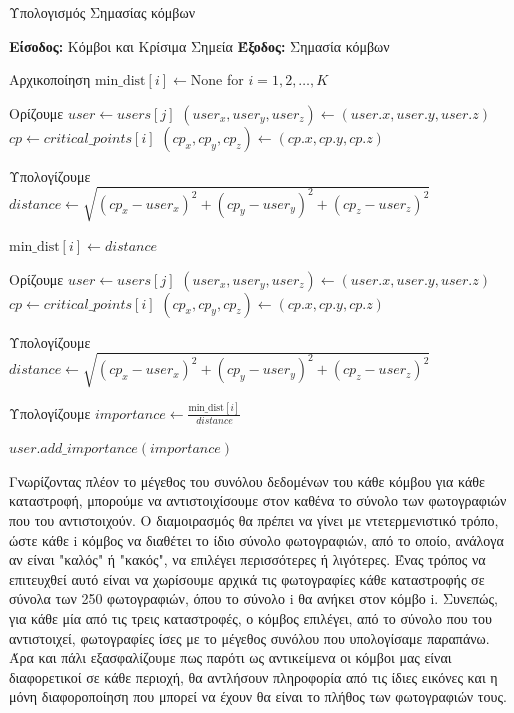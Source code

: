 \vspace{-3pt}
\begin{algorithm}[H]
    \caption{Υπολογισμός Σημασίας κόμβων} \label{algorithm3}
    \begin{algorithmic}[1]
    \STATE \textbf{Είσοδος:} Κόμβοι και Κρίσιμα Σημεία
    \STATE \textbf{Έξοδος:} Σημασία κόμβων

        \STATE Αρχικοποίηση $\text{min\_dist}[i] \gets \text{None}$ for $i = 1, 2, \dots, K$

                \STATE Ορίζουμε $user \gets users[j]$
                \STATE $(user_x, user_y, user_z) \gets (user.x, user.y, user.z)$
                \STATE $cp \gets critical\_points[i]$
                \STATE $(cp_x, cp_y, cp_z) \gets (cp.x, cp.y, cp.z)$
                
                \STATE Υπολογίζουμε $distance \gets \sqrt{(cp_x - user_x)^2 + (cp_y - user_y)^2 + (cp_z - user_z)^2}$
                
                    \STATE $\text{min\_dist}[i] \gets distance$
                \ENDIF
            \ENDFOR
    
                \STATE Ορίζουμε $user \gets users[j]$
                \STATE $(user_x, user_y, user_z) \gets (user.x, user.y, user.z)$
                \STATE $cp \gets critical\_points[i]$
                \STATE $(cp_x, cp_y, cp_z) \gets (cp.x, cp.y, cp.z)$
                
                \STATE Υπολογίζουμε $distance \gets \sqrt{(cp_x - user_x)^2 + (cp_y - user_y)^2 + (cp_z - user_z)^2}$
                
                \STATE Υπολογίζουμε $importance \gets \frac{\text{min\_dist}[i]}{distance}$
                
                \STATE $user.add\_importance(importance)$
            \ENDFOR
        \ENDFOR
    \ENDFOR
    \end{algorithmic}
\end{algorithm}
\vspace{-15pt}
    
Γνωρίζοντας πλέον το μέγεθος του συνόλου δεδομένων του κάθε κόμβου για κάθε καταστροφή, μπορούμε να αντιστοιχίσουμε στον καθένα το σύνολο των φωτογραφιών που του αντιστοιχούν. Ο διαμοιρασμός θα πρέπει να γίνει με ντετερμενιστικό τρόπο, ώστε κάθε i κόμβος να διαθέτει το ίδιο σύνολο φωτογραφιών, από το οποίο, ανάλογα αν είναι "καλός" ή "κακός", να επιλέγει περισσότερες ή λιγότερες. Ένας τρόπος να επιτευχθεί αυτό είναι να χωρίσουμε αρχικά τις φωτογραφίες κάθε καταστροφής σε σύνολα των 250 φωτογραφιών, όπου το σύνολο i θα ανήκει στον κόμβο i. Συνεπώς, για κάθε μία από τις τρεις καταστροφές, ο κόμβος επιλέγει, από το σύνολο που του αντιστοιχεί, φωτογραφίες ίσες με το μέγεθος συνόλου που υπολογίσαμε παραπάνω. Άρα και πάλι εξασφαλίζουμε πως παρότι ως αντικείμενα οι κόμβοι μας είναι διαφορετικοί σε κάθε περιοχή, θα αντλήσουν πληροφορία από τις ίδιες εικόνες και η μόνη διαφοροποίηση που μπορεί να έχουν θα είναι το πλήθος των φωτογραφιών τους.

